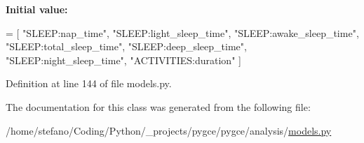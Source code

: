 {\bfseries Initial value\+:}
\begin{DoxyCode}
=  [
        \textcolor{stringliteral}{"SLEEP:nap\_time"},
        \textcolor{stringliteral}{"SLEEP:light\_sleep\_time"},
        \textcolor{stringliteral}{"SLEEP:awake\_sleep\_time"},
        \textcolor{stringliteral}{"SLEEP:total\_sleep\_time"},
        \textcolor{stringliteral}{"SLEEP:deep\_sleep\_time"},
        \textcolor{stringliteral}{"SLEEP:night\_sleep\_time"},
        \textcolor{stringliteral}{"ACTIVITIES:duration"}
    ]
\end{DoxyCode}


Definition at line 144 of file models.\+py.



The documentation for this class was generated from the following file\+:\begin{DoxyCompactItemize}
\item 
/home/stefano/\+Coding/\+Python/\+\_\+projects/pygce/pygce/analysis/\hyperlink{models_8py}{models.\+py}\end{DoxyCompactItemize}
